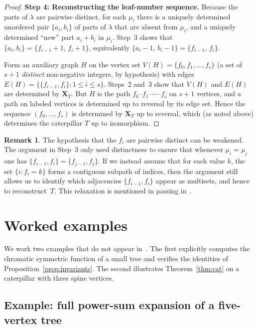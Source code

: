 \documentclass[11pt]{article}
\theoremstyle{definition}
\newtheorem{remark}[theorem]{Remark}
\newcommand{\X}{\mathbf{X}}
\begin{document}
\begin{proof}
\medskip\noindent
\textbf{Step 4: Reconstructing the leaf-number sequence.}
Because the parts of $\lambda$ are pairwise distinct, for each
$\mu_i$ there is a uniquely determined unordered pair $\{a_i,b_i\}$ of
parts of $\lambda$ that are absent from $\mu_i$, and a uniquely
determined ``new'' part $a_i+b_i$ in $\mu_i$.  Step~3 shows that
$\{a_i,b_i\} = \{f_{i-1}+1,\,f_i+1\}$, equivalently
$\{a_i-1,\,b_i-1\}=\{f_{i-1},\,f_i\}$.

Form an auxiliary graph $H$ on the vertex set
$V(H) = \{f_0,f_1,\ldots,f_s\}$ (a set of $s+1$ \emph{distinct}
non-negative integers, by hypothesis) with edges
$E(H) = \{\{f_{i-1},f_i\} : 1\leq i\leq s\}$.  Steps~2 and~3 show that
$V(H)$ and $E(H)$ are determined by $\X_T$.  But $H$ is the path
$f_0$--$f_1$--$\cdots$--$f_s$ on $s+1$ vertices, and a path on labeled
vertices is determined up to reversal by its edge set.  Hence the
sequence $(f_0,\ldots,f_s)$ is determined by $\X_T$ up to reversal,
which (as noted above) determines the caterpillar $T$ up to isomorphism.
\end{proof}

\begin{remark}\label{rem:relax}
The hypothesis that the $f_i$ are pairwise distinct can be weakened.
The argument in Step~3 only used distinctness to ensure that whenever
$\mu_i = \mu_j$ one has $\{f_{i-1},f_i\} = \{f_{j-1},f_j\}$.  If we
instead assume that for each value $k$, the set
$\{i : f_i = k\}$ forms a contiguous subpath of indices, then the
argument still allows us to identify which adjacencies $\{f_{i-1},f_i\}$
appear as multisets, and hence to reconstruct~$T$.  This relaxation is
mentioned in passing in~\cite[\S 4]{MMW}.
\end{remark}

\section{Worked examples}\label{sec:examples}

We work two examples that do not appear in~\cite{MMW}.  The first
explicitly computes the chromatic symmetric function of a small tree
and verifies the identities of Proposition~\ref{prop:invariants}.  The
second illustrates Theorem~\ref{thm:cat} on a caterpillar with three
spine vertices.

\subsection{Example: full power-sum expansion of a five-vertex tree}\label{ex:1}
\end{document}
